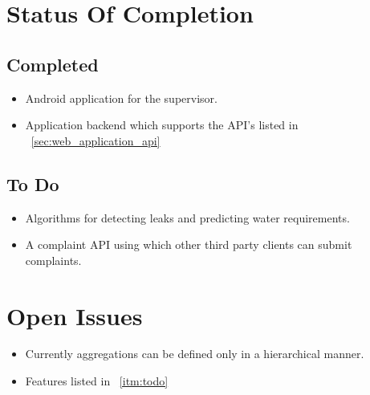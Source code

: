 \documentclass[11pt]{report} %
\begin{document}

\chapter{Status Of Completion}
\section{Completed}
\begin{itemize}
\item Android application for the supervisor.
\item Application backend which supports the API's listed in ~\ref{sec:web_application_api}
\end{itemize}
\section{To Do}
\begin{itemize}
\item Algorithms for detecting leaks and predicting water requirements.
\item A complaint API using which other third party clients can submit complaints.
\end{itemize}




\chapter{Open Issues}
\begin{itemize}
\item Currently aggregations can be defined only in a hierarchical manner.
\item Features listed in ~\ref{itm:todo}
\end{itemize}

\end{document}
